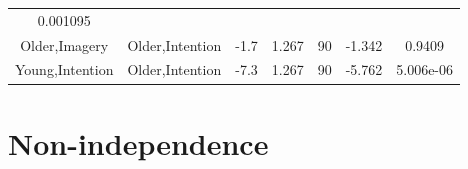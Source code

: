\documentclass[]{article}
\theoremstyle{definition}
\theoremstyle{definition}
\theoremstyle{definition}
\theoremstyle{remark}
\begin{document}
\begin{longtable}[]{@{}ccccccc@{}}
\begin{minipage}[t]{0.11\columnwidth}
0.001095\strut
\end{minipage}\tabularnewline
\begin{minipage}[t]{0.16\columnwidth}\centering\strut
Older,Imagery\strut
\end{minipage} & \begin{minipage}[t]{0.16\columnwidth}\centering\strut
Older,Intention\strut
\end{minipage} & \begin{minipage}[t]{0.10\columnwidth}\centering\strut
-1.7\strut
\end{minipage} & \begin{minipage}[t]{0.11\columnwidth}\centering\strut
1.267\strut
\end{minipage} & \begin{minipage}[t]{0.05\columnwidth}\centering\strut
90\strut
\end{minipage} & \begin{minipage}[t]{0.11\columnwidth}\centering\strut
-1.342\strut
\end{minipage} & \begin{minipage}[t]{0.11\columnwidth}\centering\strut
0.9409\strut
\end{minipage}\tabularnewline
\begin{minipage}[t]{0.16\columnwidth}\centering\strut
Young,Intention\strut
\end{minipage} & \begin{minipage}[t]{0.16\columnwidth}\centering\strut
Older,Intention\strut
\end{minipage} & \begin{minipage}[t]{0.10\columnwidth}\centering\strut
-7.3\strut
\end{minipage} & \begin{minipage}[t]{0.11\columnwidth}\centering\strut
1.267\strut
\end{minipage} & \begin{minipage}[t]{0.05\columnwidth}\centering\strut
90\strut
\end{minipage} & \begin{minipage}[t]{0.11\columnwidth}\centering\strut
-5.762\strut
\end{minipage} & \begin{minipage}[t]{0.11\columnwidth}\centering\strut
5.006e-06\strut
\end{minipage}\tabularnewline
\bottomrule
\end{longtable}

\hypertarget{clustering}{\section{Non-independence}\label{clustering}}
\end{document}
